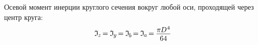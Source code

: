 \documentclass[14pt]{extarticle}
\begin{document}
\newpage

Осевой момент инерции круглого сечения вокруг любой оси, проходящей через центр круга:
\[
\mathfrak{I}_{\hspace{-0.1ex}\scalebox{.8}{$z$}} \hspace{-0.25ex}=\hspace{-0.1ex}
\mathfrak{I}_{\hspace{-0.1ex}\scalebox{.8}{$y$}} \hspace{-0.25ex}=\hspace{-0.1ex}
\mathfrak{I}_{\hspace{-0.1ex}\scalebox{.8}{$b$}} \hspace{-0.25ex}=\hspace{-0.1ex}
\mathfrak{I}_{\hspace{-0.1ex}\scalebox{.8}{$a$}} \hspace{-0.25ex}=\hspace{-0.1ex}
\displaystyle\frac{\raisebox{-0.18em}{$\pi \hspace{-0.1ex} D^{\hspace{.1ex}4}$}}{64}
\]
\end{document}
